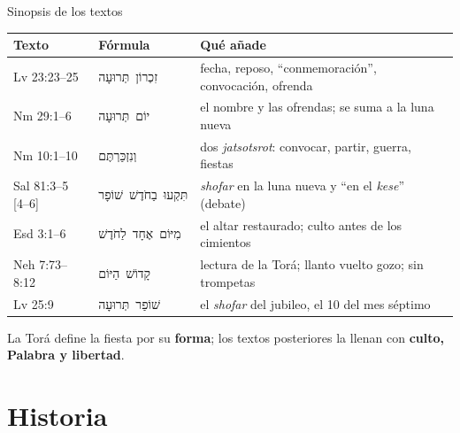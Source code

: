 \documentclass[hyperref={bookmarks=false},aspectratio=169]{beamer}
\newcommand{\heb}[1]{\mbox{\foreignlanguage{hebrew}{#1}}}
\newcommand{\destacar}[1]{\textbf{\textcolor{tierraroja}{#1}}}
\begin{document}
\begin{frame}{Sinopsis de los textos}
\renewcommand{\arraystretch}{1.12}\scriptsize
\begin{tabular}{@{}L{2.1cm}L{3.0cm}L{6.5cm}@{}}
\toprule
\textbf{Texto} & \textbf{Fórmula} & \textbf{Qué añade} \\ \midrule
Lv 23:23--25 & \heb{זִכְרוֹן תְּרוּעָה} & fecha, reposo, ``conmemoración'', convocación, ofrenda \\
Nm 29:1--6 & \heb{יוֹם תְּרוּעָה} & el nombre y las ofrendas; se suma a la luna nueva \\
Nm 10:1--10 & \heb{וְנִזְכַּרְתֶּם} & dos \emph{jatsotsrot}: convocar, partir, guerra, fiestas \\
Sal 81:3--5 [4--6] & \heb{תִּקְעוּ בַחֹדֶשׁ שׁוֹפָר} & \emph{shofar} en la luna nueva y ``en el \emph{kese}'' (debate) \\
Esd 3:1--6 & \heb{מִיּוֹם אֶחָד לַחֹדֶשׁ} & el altar restaurado; culto antes de los cimientos \\
Neh 7:73--8:12 & \heb{קָדוֹשׁ הַיּוֹם} & lectura de la Torá; llanto vuelto gozo; sin trompetas \\
Lv 25:9 & \heb{שׁוֹפַר תְּרוּעָה} & el \emph{shofar} del jubileo, el 10 del mes séptimo \\
\bottomrule
\end{tabular}\par\medskip
\small\RaggedRight La Torá define la fiesta por su \destacar{forma}; los textos posteriores la llenan con \destacar{culto, Palabra y libertad}.
\end{frame}

\section{Historia}
\end{document}
